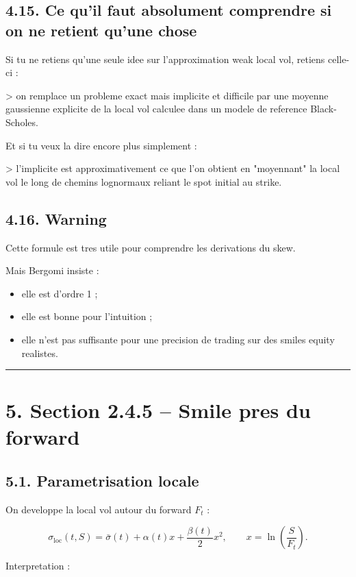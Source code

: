 \documentclass[11pt,a4paper]{article}
\begin{document}
\subsection{4.15. Ce qu'il faut absolument comprendre si on ne retient qu'une chose}

Si tu ne retiens qu'une seule idee sur l'approximation weak local vol, retiens celle-ci :

> on remplace un probleme exact mais implicite et difficile par une moyenne gaussienne explicite de la local vol calculee dans un modele de reference Black-Scholes.

Et si tu veux la dire encore plus simplement :

> l'implicite est approximativement ce que l'on obtient en "moyennant" la local vol le long de chemins lognormaux reliant le spot initial au strike.

\subsection{4.16. Warning}

Cette formule est tres utile pour comprendre les derivations du skew.

Mais Bergomi insiste :

\begin{itemize}
\item elle est d'ordre 1 ;
\item elle est bonne pour l'intuition ;
\item elle n'est pas suffisante pour une precision de trading sur des smiles equity realistes.
\end{itemize}

\bigskip\hrule\bigskip

\section{5. Section 2.4.5 -- Smile pres du forward}

\subsection{5.1. Parametrisation locale}

On developpe la local vol autour du forward \(F_t\) :

\[
\sigma_{\mathrm{loc}}(t,S)=\bar{\sigma}(t)+\alpha(t)x+\frac{\beta(t)}{2}x^2,
\qquad
x=\ln\!\left(\frac{S}{F_t}\right).
\]

Interpretation :
\end{document}
